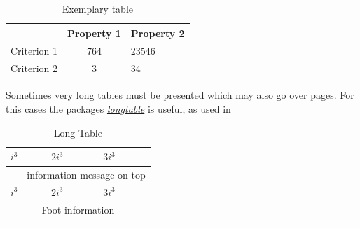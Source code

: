 \documentclass[a4paper,11pt,oneside]{book}
\newcommand{\imp}[1]{\underline{\textit{#1}}}
\begin{document}
\begin{table}[!h]
	\centering
	\begin{tabular}{l|cl}
		\hline \hline
		
		& Property 1
		& Property 2\\ \hline
		Criterion 1
		& 764
		& 23546 \\
		Criterion 2
		& 3
		& 34 \\
		\hline \hline
	\end{tabular}
	\caption{Exemplary table}
	\label{ft_tab_ex}
\end{table}

Sometimes very long tables must be presented which may also go over pages. For this cases the packages \imp{longtable} is useful, as used in 

\begin{center}
	\begin{longtable}{l|l|l}
		
		
		\hline \hline
		$i^3$ & $2i^3$ & $3i^3$ \bigstrut \\ \hline
		\endfirsthead
		
		\multicolumn{3}{c}{\tablename\ \thetable{} -- information message on top} \\
		\hline
		$i^3$ & $2i^3$ & $3i^3$ \bigstrut \\ \hline 
		\endhead
		
		\hline
		\multicolumn{3}{c}{Foot information} \\ \hline
		\endfoot
		
		\hline \hline
		\caption{Long Table}
		\label{lt}
		\endlastfoot
		

\end{longtable}
\end{center}
\end{document}
